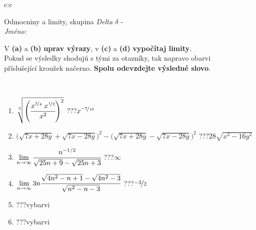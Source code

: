 \documentclass[10pt]{report}
\begin{document}
\newpage
\thispagestyle{empty}
\begin{tabular}{c:c}
\begin{minipage}[c][104.5mm][t]{0.5\linewidth}
\begin{center}
\vspace{7mm}
{\huge Odmocniny a limity, skupina \textit{Delta $\delta$} -}\\[5mm]
\textit{Jméno:}\phantom{xxxxxxxxxxxxxxxxxxxxxxxxxxxxxxxxxxxxxxxxxxxxxxxxxxxxxxxxxxxxxxxxx}\\[5mm]
\begin{minipage}{0.95\linewidth}
\begin{center}
V \textbf{(a)} a \textbf{(b)} \textbf{uprav výrazy}, v \textbf{(c)} a \textbf{(d)} \textbf{vypočítaj limity}.\\Pokud se výsledky shodujú s tými za otazníky, tak napravo obarvi\\příslušející kroužek načerno. \textbf{Spolu odevzdejte výsledné slovo}.
\end{center}
\end{minipage}
\\[1mm]
\begin{minipage}{0.79\linewidth}
\begin{center}
\begin{varwidth}{\linewidth}
\begin{enumerate}
\small
\item $\sqrt[5]{\left(\cfrac{x^{\nicefrac{3}{4}}\;x^{\nicefrac{1}{2}}}{x^{2}}\right)^{2}}$\quad \dotfill\; ???\;\dotfill \quad $x^{\nicefrac{-7}{10}}$
\item {\footnotesize{\scriptsize$\big(\sqrt{7x+28y}+\sqrt{7x-28y}\big)^2-\big(\sqrt{7x+28y}-\sqrt{7x-28y}\big)^2$}\quad \dotfill\; ???\;\dotfill \quad $28\sqrt{x^2-16y^2}$}
\item $\lim\limits_{n\to\infty}\cfrac{n^{-1/2}}{\sqrt{25n+9}-\sqrt{25n+3}}$\quad \dotfill\; ???\;\dotfill \quad $\infty$
\item $\lim\limits_{n\to\infty}3n\cfrac{\sqrt{4n^2-n+1}-\sqrt{4n^2-3}}{\sqrt{n^2-n-3}}$\quad \dotfill\; ???\;\dotfill \quad $\nicefrac{-3}{2}$
\item \quad \dotfill\; ???\;\dotfill \quad vybarvi
\item \quad \dotfill\; ???\;\dotfill \quad vybarvi
\end{enumerate}
\end{varwidth}
\end{center}
\end{minipage}
\begin{minipage}{0.20\linewidth}

\end{minipage}
\end{center}
\end{minipage}
\end{tabular}
\end{document}
